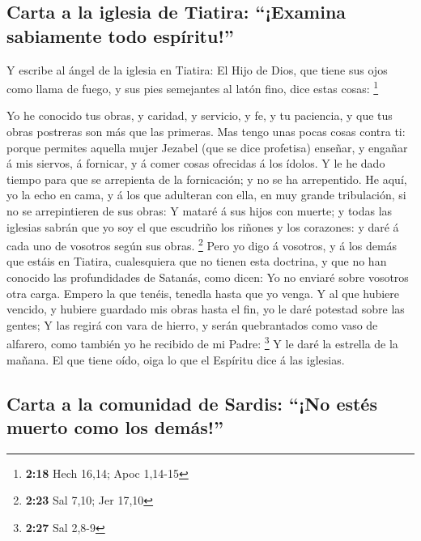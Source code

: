 \hypertarget{carta-a-la-iglesia-de-tiatira-examina-sabiamente-todo-espuxedritu}{%
\subsection{Carta a la iglesia de Tiatira: ``¡Examina sabiamente todo
espíritu!''}\label{carta-a-la-iglesia-de-tiatira-examina-sabiamente-todo-espuxedritu}}

 Y escribe al ángel de la iglesia en Tiatira: El Hijo de
Dios, que tiene sus ojos como llama de fuego, y sus pies semejantes al
latón fino, dice estas cosas: \footnote{\textbf{2:18} Hech 16,14; Apoc
  1,14-15}

 Yo he conocido tus obras, y caridad, y servicio, y fe, y
tu paciencia, y que tus obras postreras son más que las primeras.
 Mas tengo unas pocas cosas contra ti: porque permites
aquella mujer Jezabel (que se dice profetisa) enseñar, y engañar á mis
siervos, á fornicar, y á comer cosas ofrecidas á los ídolos.
 Y le he dado tiempo para que se arrepienta de la
fornicación; y no se ha arrepentido.  He aquí, yo la echo
en cama, y á los que adulteran con ella, en muy grande tribulación, si
no se arrepintieren de sus obras:  Y mataré á sus hijos con
muerte; y todas las iglesias sabrán que yo soy el que escudriño los
riñones y los corazones: y daré á cada uno de vosotros según sus obras.
\footnote{\textbf{2:23} Sal 7,10; Jer 17,10}  Pero yo digo
á vosotros, y á los demás que estáis en Tiatira, cualesquiera que no
tienen esta doctrina, y que no han conocido las profundidades de
Satanás, como dicen: Yo no enviaré sobre vosotros otra carga.
 Empero la que tenéis, tenedla hasta que yo venga.
 Y al que hubiere vencido, y hubiere guardado mis obras
hasta el fin, yo le daré potestad sobre las gentes;  Y las
regirá con vara de hierro, y serán quebrantados como vaso de alfarero,
como también yo he recibido de mi Padre: \footnote{\textbf{2:27} Sal
  2,8-9}  Y le daré la estrella de la mañana. 
El que tiene oído, oiga lo que el Espíritu dice á las iglesias.

\hypertarget{carta-a-la-comunidad-de-sardis-no-estuxe9s-muerto-como-los-demuxe1s}{%
\subsection{Carta a la comunidad de Sardis: ``¡No estés muerto como los
demás!''}\label{carta-a-la-comunidad-de-sardis-no-estuxe9s-muerto-como-los-demuxe1s}}

